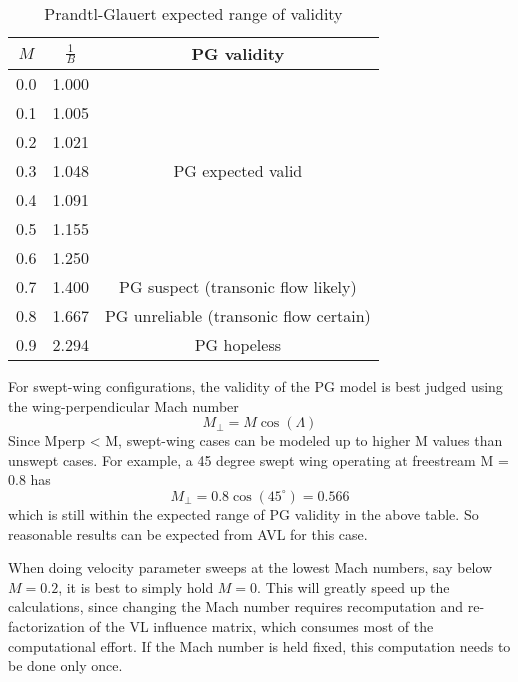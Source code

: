 \begin{table} [!h]\centering {}
	\begin{tabular}{c c |c}
		\toprule
		\emph{$M$ } &  $\frac{1}{B}$ & PG validity  \\ 
		\midrule
		0.0 & 1.000 \quad & \\
		0.1 & 1.005 \quad &\\
		0.2 & 1.021 \quad &\\
		0.3 & 1.048 \quad & PG expected valid\\
		0.4 & 1.091 \quad &\\
		0.5 & 1.155 \quad &\\
		0.6 & 1.250 \quad &\\
		\midrule
		0.7 & 1.400 \quad &   PG suspect    (transonic flow likely)\\
		0.8 & 1.667 \quad &   PG unreliable (transonic flow certain)\\
		0.9 & 2.294 \quad &   PG hopeless \\
		\bottomrule
	\end{tabular}
	\caption {\footnotesize Prandtl-Glauert expected
		range of validity}
	\label{tab1}
\end{table}

For swept-wing configurations, the validity of the PG model
is best judged using the wing-perpendicular Mach number
\[M_\perp  =  M \cos(\Lambda)\]
Since Mperp < M, swept-wing cases can be modeled up to higher
M values than unswept cases.  For example, a 45 degree swept wing
operating at freestream M = 0.8 has 
\[M_\perp  =  0.8 \cos(45^\circ)=0.566\]
which is still within the expected range of PG validity 
in the above table.  So reasonable results can be expected
from AVL for this case.

When doing velocity parameter sweeps at the lowest Mach numbers, 
say below $M = 0.2$, it is best to simply hold $M = 0$.  This will
greatly speed up the calculations, since changing the Mach number 
requires recomputation and re-factorization of the VL influence matrix,
which consumes most of the computational effort.  If the Mach number
is held fixed, this computation needs to be done only once.

